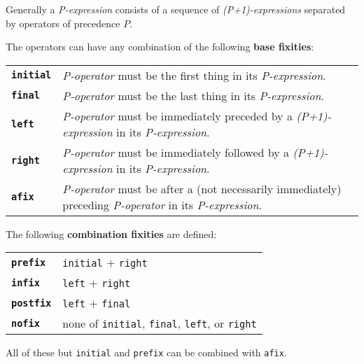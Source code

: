 \documentclass[12pt]{article}
\newcommand{\key}[1]{{\rm \bfseries #1}}
\newcommand{\ttkey}[1]{{\tt \bfseries #1}}
\begin{document}
Generally
a {\em P-expression} consists of a sequence of {\em (P+1)-expressions}
separated by operators of precedence $P$.

The operators can have any combination of the following \key{base fixities}:

\begin{center}
\begin{tabular}{lp{5.0in}}
\ttkey{initial}	& {\em P-operator} must be the first thing
                  in its {\em P-expression}. \\
\ttkey{final}	& {\em P-operator} must be the last thing
                  in its {\em P-expression}. \\
\ttkey{left}	& {\em P-operator} must be immediately
                  preceded by a {\em (P+1)-expression}
                  in its {\em P-expression}. \\
\ttkey{right}	& {\em P-operator} must be immediately
                  followed by a {\em (P+1)-expression}
                  in its {\em P-expression}. \\
\ttkey{afix}	& {\em P-operator} must be after a (not necessarily
                  immediately) preceding {\em P-operator}
                  in its {\em P-expression}. \\
\end{tabular}
\end{center}

The following \key{combination fixities} are defined:

\begin{center}
\begin{tabular}{ll}
\ttkey{prefix}	& {\tt initial} + {\tt right} \\
\ttkey{infix}	& {\tt left} + {\tt right} \\
\ttkey{postfix}	& {\tt left} + {\tt final} \\
\ttkey{nofix}	& none of {\tt initial}, {\tt final}, {\tt left},
                  or {\tt right} \\
\end{tabular}
\end{center}

All of these but {\tt initial} and {\tt prefix} can be combined with {\tt afix}.

\newpage
\end{document}
